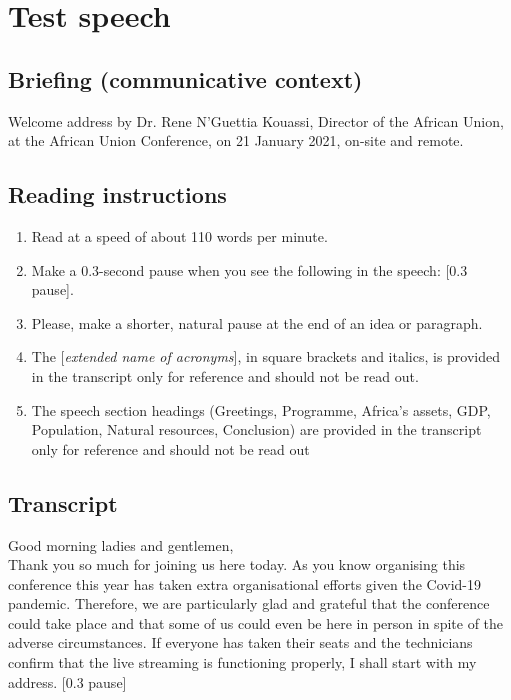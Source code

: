 \chapter{Test speech}


\section{Briefing (communicative context)}

\begin{sloppypar}
Welcome address by Dr. Rene N’Guettia Kouassi, Director of the African Union, at the African Union Conference, on 21 January 2021, on-site and remote.
\end{sloppypar}

\section{Reading instructions}
\begin{enumerate}
    \item Read at a speed of about 110 words per minute. 
    \item Make a 0.3-second pause when you see the following in the speech: [0.3 pause]. 
    \item Please, make a shorter, natural pause at the end of an idea or paragraph. 
    \item The [\textit{extended name of acronyms}], in square brackets and italics, is provided in the transcript only for reference and should not be read out. 
    \item The speech section headings (Greetings, Programme, Africa’s assets, GDP, Population, Natural resources, Conclusion) are provided in the transcript only for reference and should not be read out
\end{enumerate}

\section{Transcript}

\noindent Good morning ladies and gentlemen, \\
Thank you so much for joining us here today. As you know organising this conference this year has taken extra organisational efforts given the Covid-19 pandemic. Therefore, we are particularly glad and grateful that the conference could take place and that some of us could even be here in person in spite of the adverse circumstances. If everyone has taken their seats and the technicians confirm that the live streaming is functioning properly, I shall start with my address. [0.3 pause] \\


